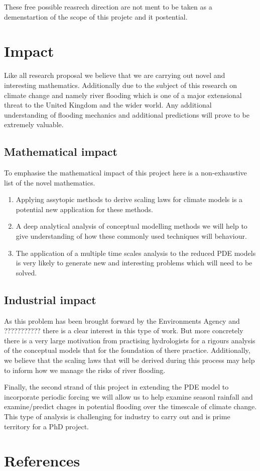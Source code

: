 \documentclass[11pt]{article}
\begin{document}
These free possible reasrech direction are not ment to be taken as a demenstartion of the scope of this projetc and it postential.



\section{Impact}
Like all research proposal we believe that we are carrying out novel and interesting mathematics. Additionally due to the subject of this research on climate change and namely river flooding which is one of a major extensional threat to the United Kingdom and the wider world. Any additional understanding of flooding mechanics and additional predictions will prove to be extremely valuable.
\subsection{Mathematical impact}
To emphasise the mathematical impact of this project here is a non-exhaustive list of the novel mathematics. 
\begin{enumerate}
    \item Applying assytopic methods to derive scaling laws for climate models is a potential new application for these methods.
    \item A deep analytical analysis of conceptual modelling methods we will help to give understanding of how these commonly used techniques will behaviour.
    \item The application of a multiple time scales analysis to the reduced PDE models is very likely to generate new and interesting problems which will need to be solved.
\end{enumerate}

\subsection{Industrial impact}
As this problem has been brought forward by the Environments Agency and ??????????? there is a clear interest in this type of work. But more concretely there is a very large motivation from practising hydrologists for a rigours analysis of the conceptual models that for the foundation of there practice. Additionally, we believe that the scaling laws that will be derived during this process may help to inform how we manage the risks of river flooding.

Finally, the second strand of this project in extending the PDE model to incorporate periodic forcing we will allow us to help examine seasonl rainfall and examine/predict chages in potential flooding over the timescale of climate change. This type of analysis is challenging for industry to carry out and is prime territory for a PhD project.




\section{References}
\end{document}
